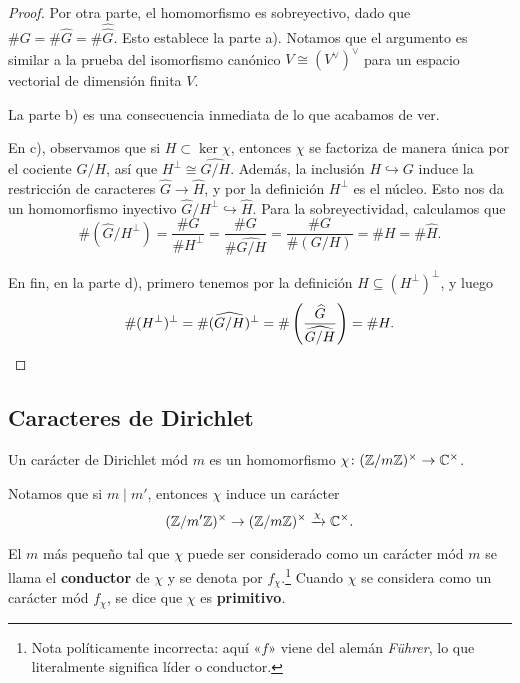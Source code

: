 \begin{proposicion}
\begin{proof}
    Por otra parte, el homomorfismo es sobreyectivo, dado que
    $\# G = \# \widehat{G} = \# \widehat{\widehat{G}}$. Esto establece la parte
    a). Notamos que el argumento es similar a la prueba del isomorfismo canónico
    $V \cong (V^\vee)^\vee$ para un espacio vectorial de dimensión finita $V$.

    La parte b) es una consecuencia inmediata de lo que acabamos de ver.

    En c), observamos que si $H \subset \ker \chi$, entonces $\chi$ se factoriza
    de manera única por el cociente $G/H$, así que $H^\perp \cong \widehat{G/H}$.
    Además, la inclusión $H \hookrightarrow G$ induce la restricción de
    caracteres $\widehat{G} \to \widehat{H}$, y por la definición
    $H^\perp$ es el núcleo. Esto nos da un homomorfismo inyectivo
    $\widehat{G}/H^\perp \hookrightarrow \widehat{H}$. Para la sobreyectividad,
    calculamos que
    \[ \# (\widehat{G}/H^\perp) = \frac{\# G}{\# H^\perp} =
    \frac{\# G}{\# \widehat{G/H}} = \frac{\# G}{\# (G/H)} =
    \# H = \# \widehat{H}. \]

    En fin, en la parte d), primero tenemos por la definición
    $H \subseteq (H^\perp)^\perp$, y luego
    \[ \# (H^\perp)^\perp = \# (\widehat{G/H})^\perp =
       \# \left(\frac{\widehat{G}}{\widehat{G/H}}\right) = \# H. \qedhere \]
  \end{proof}
\end{proposicion}

\subsection{Caracteres de Dirichlet}

\begin{definicion}
  Un carácter de Dirichlet mód $m$ es un homomorfismo
  $\chi\colon (\mathbb{Z}/m\mathbb{Z})^\times \to \mathbb{C}^\times$.
\end{definicion}

Notamos que si $m \mid m'$, entonces $\chi$ induce un carácter
\[ (\mathbb{Z}/m'\mathbb{Z})^\times \to (\mathbb{Z}/m\mathbb{Z})^\times \xrightarrow{\chi} \mathbb{C}^\times. \]

\begin{definicion}
  El $m$ más pequeño tal que $\chi$ puede ser considerado como un carácter mód
  $m$ se llama el \textbf{conductor} de $\chi$ y se denota por
  $f_\chi$.\footnote{Nota políticamente incorrecta: aquí «$f$» viene del alemán
    \emph{Führer}, lo que literalmente significa líder o conductor.}  Cuando
  $\chi$ se considera como un carácter mód $f_\chi$, se dice que $\chi$ es
  \textbf{primitivo}.
\end{definicion}

